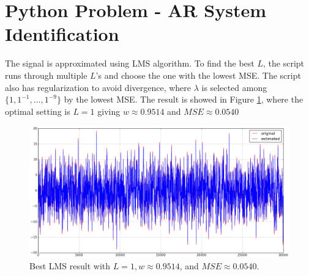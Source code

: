 \section{Python Problem - AR System Identification}\label{sec:p6}

The signal is approximated using LMS algorithm. To find the best $L$, the script runs through multiple $L$'s and choose the one with the lowest MSE. The script also has regularization to avoid divergence, where $\lambda$ is selected among $\{1, 1^{-1}, ..., 1^{-9}\}$ by the lowest MSE. The result is showed in Figure \ref{fig:p6}, where the optimal setting is $L=1$ giving $w \approx 0.9514$ and $MSE \approx 0.0540$

\begin{figure}[htbp]
	\centering
	\includegraphics[width=\textwidth]{images/p6}
	\caption{Best LMS result with $L=1, w \approx 0.9514$, and $MSE \approx 0.0540$.}
	\label{fig:p6}
\end{figure}